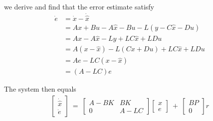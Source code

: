 we derive and find that the error estimate satisfy
\begin{align*}
\dot{e}     &= \dot{x} - \dot{\hat{x}}\\
            &= Ax+Bu-A\hat{x}-Bu-L(y-C\hat{x}-Du)\\
            &= Ax - A\hat{x} -Ly + LC\hat{x} + LDu\\
            &= A(x -\hat{x})- L(Cx + Du) + LC\hat{x} + LDu\\
            &= Ae - LC(x - \hat{x})\\
            &= (A - LC)e
\end{align*}

The system then equals
\begin{align*}
\begin{bmatrix}
    \dot{\hat{x}}\\
    \dot{e}
\end{bmatrix}\ = \
\begin{bmatrix}
    A-BK     &   BK\\
    0        &   A-LC
\end{bmatrix}
\begin{bmatrix}
    x\\
    e
\end{bmatrix}\ + \
\begin{bmatrix}
    BP\\
    0
\end{bmatrix}r
\end{align*}

